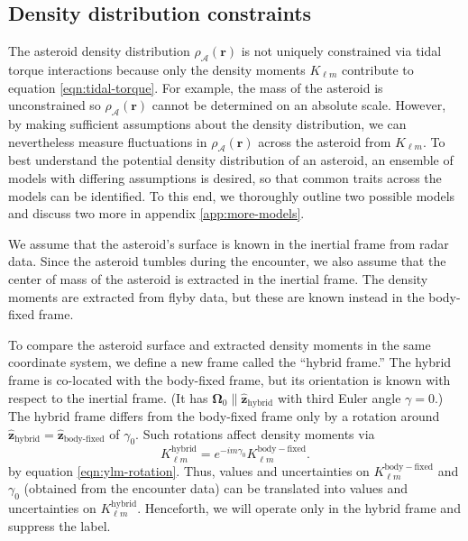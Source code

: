\documentclass[fleqn,usenatbib]{mnras}
\renewcommand{\unit}[1]{\bm{\hat{#1}}}
\begin{document}
\subsection{Density distribution constraints}
\label{sec:density-distro}

The asteroid density distribution $\rho_\mathcal{A}(\bm r)$ is not uniquely constrained via tidal torque interactions because only the density moments $K_{\ell m}$ contribute to equation \ref{eqn:tidal-torque}. For example, the mass of the asteroid is unconstrained so $\rho_\mathcal{A}(\bm r)$ cannot be determined on an absolute scale. However, by making sufficient assumptions about the density distribution, we can nevertheless measure fluctuations in $\rho_\mathcal{A}(\bm r)$ across the asteroid from $K_{\ell m}$. To best understand the potential density distribution of an asteroid, an ensemble of models with differing assumptions is desired, so that common traits across the models can be identified. To this end, we thoroughly outline two possible models and discuss two more in appendix \ref{app:more-models}.

We assume that the asteroid's surface is known in the inertial frame from radar data. Since the asteroid tumbles during the encounter, we also assume that the center of mass of the asteroid is extracted in the inertial frame. The density moments are extracted from flyby data, but these are known instead in the body-fixed frame.

To compare the asteroid surface and extracted density moments in the same coordinate system, we define a new frame called the ``hybrid frame.'' The hybrid frame is co-located with the body-fixed frame, but its orientation is known with respect to the inertial frame. (It has $\bm \Omega_0 \parallel \unit z_\text{hybrid}$ with third Euler angle $\gamma = 0$.) The hybrid frame differs from the body-fixed frame only by a rotation around $\unit z_\text{hybrid}=\unit z_\text{body-fixed}$ of $\gamma_0$. Such rotations affect density moments via 
\begin{equation}
  K_{\ell m}^\mathrm{hybrid} = e^{-im\gamma_0}K_{\ell m}^\mathrm{body-fixed}.
  \label{eqn:body-fixed-to-hybrid}
\end{equation}
by equation \ref{eqn:ylm-rotation}. Thus, values and  uncertainties on $K_{\ell m}^\mathrm{body-fixed}$ and $\gamma_0$ (obtained from the encounter data) can be translated into values and uncertainties on $K_{\ell m}^\mathrm{hybrid}$. Henceforth, we will operate only in the hybrid frame and suppress the label.
\end{document}
